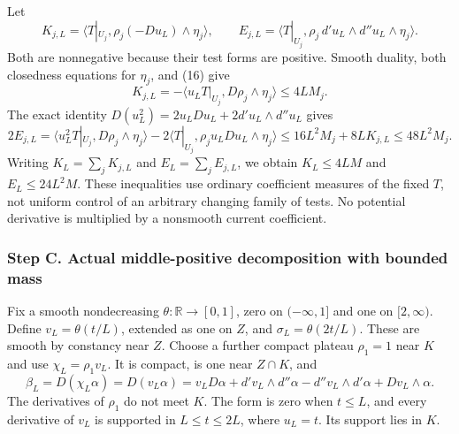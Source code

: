 \documentclass[11pt]{article}
\begin{document}
Let
\[
 K_{j,L}=\langle T|_{U_j},\rho_j(-Du_L)\wedge\eta_j\rangle,\qquad
 E_{j,L}=\langle T|_{U_j},\rho_j\,d'u_L\wedge d''u_L\wedge\eta_j\rangle.
\]
Both are nonnegative because their test forms are positive. Smooth duality, both closedness equations for \(\eta_j\), and (16) give
\[
 K_{j,L}=-\langle u_LT|_{U_j},D\rho_j\wedge\eta_j\rangle\leq4LM_j.
\tag{17}
\]
The exact identity \(D(u_L^2)=2u_LDu_L+2d'u_L\wedge d''u_L\) gives
\[
 2E_{j,L}=\langle u_L^2T|_{U_j},D\rho_j\wedge\eta_j\rangle
       -2\langle T|_{U_j},\rho_j u_LDu_L\wedge\eta_j\rangle
 \leq16L^2M_j+8LK_{j,L}\leq48L^2M_j.
\tag{18}
\]
Writing \(K_L=\sum_jK_{j,L}\) and \(E_L=\sum_jE_{j,L}\), we obtain \(K_L\leq4LM\) and \(E_L\leq24L^2M\). These inequalities use ordinary coefficient measures of the fixed \(T\), not uniform control of an arbitrary changing family of tests. No potential derivative is multiplied by a nonsmooth current coefficient.

\subsubsection{Step C. Actual middle-positive decomposition with bounded mass}

Fix a smooth nondecreasing \(\theta:\mathbb R\to[0,1]\), zero on \(( -\infty,1]\) and one on \([2,\infty)\). Define \(v_L=\theta(t/L)\), extended as one on \(Z\), and \(\sigma_L=\theta(2t/L)\). These are smooth by constancy near \(Z\). Choose a further compact plateau \(\rho_1=1\) near \(K\) and use \(\chi_L=\rho_1v_L\). It is compact, is one near \(Z\cap K\), and
\[
 \beta_L=D(\chi_L\alpha)=D(v_L\alpha)
 =v_LD\alpha+d'v_L\wedge d''\alpha-d''v_L\wedge d'\alpha
     +Dv_L\wedge\alpha.
\tag{19}
\]
The derivatives of \(\rho_1\) do not meet \(K\). The form is zero when \(t\leq L\), and every derivative of \(v_L\) is supported in \(L\leq t\leq2L\), where \(u_L=t\). Its support lies in \(K\).
\end{document}
